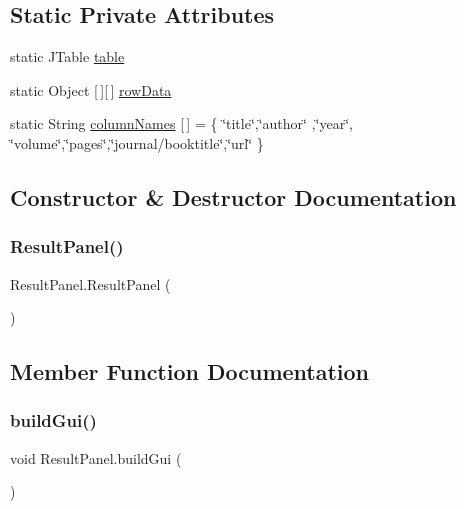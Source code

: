 \subsection*{Static Private Attributes}
\begin{DoxyCompactItemize}
\item 
static J\+Table \hyperlink{class_result_panel_a7efcc61cd33b439bb4a4ce365a05fcd9}{table}
\item 
static Object \mbox{[}$\,$\mbox{]}\mbox{[}$\,$\mbox{]} \hyperlink{class_result_panel_ac748be7e13e72b23ee1b7486c71e4400}{row\+Data}
\item 
static String \hyperlink{class_result_panel_ad2246ab66ef229df1e6d89d570e19364}{column\+Names} \mbox{[}$\,$\mbox{]} = \{ \char`\"{}title\char`\"{},\char`\"{}author\char`\"{} ,\char`\"{}year\char`\"{}, \char`\"{}volume\char`\"{},\char`\"{}pages\char`\"{},\char`\"{}journal/booktitle\char`\"{},\char`\"{}url\char`\"{} \}
\end{DoxyCompactItemize}


\subsection{Constructor \& Destructor Documentation}
\hypertarget{class_result_panel_a1f0864074da52caf14581a14b2574d48}{}\label{class_result_panel_a1f0864074da52caf14581a14b2574d48} 
\subsubsection{\texorpdfstring{Result\+Panel()}{ResultPanel()}}
{\footnotesize\ttfamily Result\+Panel.\+Result\+Panel (\begin{DoxyParamCaption}{ }\end{DoxyParamCaption})}



\subsection{Member Function Documentation}
\hypertarget{class_result_panel_a42092133d8e2f6819a8f1ee557b2fc1f}{}\label{class_result_panel_a42092133d8e2f6819a8f1ee557b2fc1f} 
\subsubsection{\texorpdfstring{build\+Gui()}{buildGui()}}
{\footnotesize\ttfamily void Result\+Panel.\+build\+Gui (\begin{DoxyParamCaption}{ }\end{DoxyParamCaption})\hspace{0.3cm}{\ttfamily [private]}}


